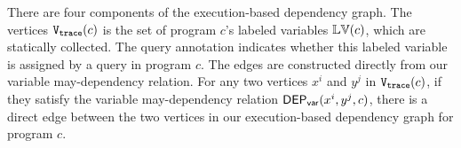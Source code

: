 There are four components of the execution-based dependency graph. 
The vertices $\mathtt{{V_{trace}}}(c)$ is the set of program $c$'s labeled variables $\mathbb{LV}(c)$,
which are statically collected.
The query annotation 
indicates whether this labeled variable is assigned by a query in program $c$.
{
The edges are constructed directly from our variable may-dependency relation. 
For any two vertices $x^{i}$ and $y^{j}$ in $\mathtt{{V_{trace}}}(c)$, if they satisfy the variable may-dependency relation $\mathsf{DEP_{var}}(x^i, y^j, c)$, there is a direct edge between the two vertices in our execution-based dependency graph for program $c$.
} 
